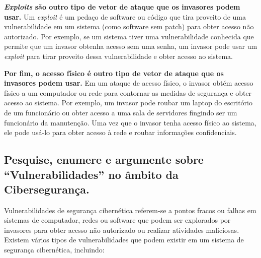 \textbf{\textit{Exploits} são outro tipo de vetor de ataque que os invasores podem usar.} Um \textit{exploit} é um pedaço de software ou código que tira proveito de uma vulnerabilidade em um sistema (como software sem patch) para obter acesso não autorizado. Por exemplo, se um sistema tiver uma vulnerabilidade conhecida que permite que um invasor obtenha acesso sem uma senha, um invasor pode usar um \textit{exploit} para tirar proveito dessa vulnerabilidade e obter acesso ao sistema.

\textbf{Por fim, o acesso físico é outro tipo de vetor de ataque que os invasores podem usar.} Em um ataque de acesso físico, o invasor obtém acesso físico a um computador ou rede para contornar as medidas de segurança e obter acesso ao sistema. Por exemplo, um invasor pode roubar um laptop do escritório de um funcionário ou obter acesso a uma sala de servidores fingindo ser um funcionário da manutenção. Uma vez que o invasor tenha acesso físico ao sistema, ele pode usá-lo para obter acesso à rede e roubar informações confidenciais.

\subsection[Extensão à Pergunta 1]{Pesquise, enumere e argumente sobre ``Vulnerabilidades'' no âmbito da Cibersegurança.}

Vulnerabilidades de segurança cibernética referem-se a pontos fracos ou falhas em sistemas de computador, redes ou software que podem ser explorados por invasores para obter acesso não autorizado ou realizar atividades maliciosas. Existem vários tipos de vulnerabilidades que podem existir em um sistema de segurança cibernética, incluindo:

